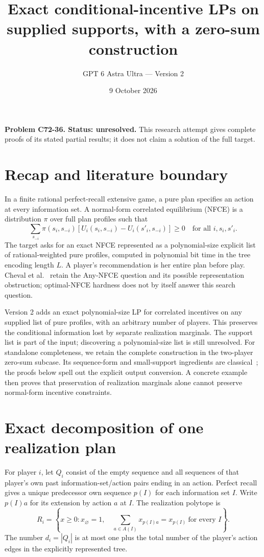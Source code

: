\documentclass[11pt]{article}
\title{Exact conditional-incentive LPs on supplied supports, with a zero-sum construction}
\author{GPT 6 Astra Ultra --- Version 2}
\date{9 October 2026}
\theoremstyle{definition}
\begin{document}
\maketitle
\noindent\textbf{Problem C72-36. Status: unresolved.} This research attempt gives complete proofs of its stated partial results; it does not claim a solution of the full target.

\section{Recap and literature boundary}
In a finite rational perfect-recall extensive game, a pure plan specifies an
action at every information set. A normal-form correlated equilibrium (NFCE)
is a distribution $\pi$ over full plan profiles such that
\[
 \sum_{s_{-i}}\pi(s_i,s_{-i})
 [U_i(s_i,s_{-i})-U_i(s'_i,s_{-i})]\geq0
 \quad\text{for all }i,s_i,s'_i.
\]
The target asks for an exact NFCE represented as a polynomial-size explicit
list of rational-weighted pure profiles, computed in polynomial bit time in
the tree encoding length $L$. A player's recommendation is her entire plan
before play. Cheval et al.~\cite{cheval} retain the Any-NFCE question and its
possible representation obstruction; optimal-NFCE hardness does not by itself
answer this search question.

Version 2 adds an exact polynomial-size LP for correlated incentives on any
supplied list of pure profiles, with an arbitrary number of players. This
preserves the conditional information lost by separate realization marginals.
The support list is part of the input; discovering a polynomial-size list is
still unresolved. For standalone completeness, we retain the complete
construction in the two-player zero-sum subcase. Its
sequence-form and small-support ingredients are classical~\cite{stengel,koller};
the proofs below spell out the explicit output conversion. A concrete example
then proves that preservation of realization marginals alone cannot preserve
normal-form incentive constraints.

\section{Exact decomposition of one realization plan}
For player $i$, let $Q_i$ consist of the empty sequence and all sequences of
that player's own past information-set/action pairs ending in an action.
Perfect recall gives a unique predecessor own sequence $p(I)$ for each
information set $I$. Write $p(I)a$ for its extension by action $a$ at $I$.
The realization polytope is
\[
 R_i=\left\{x\geq0:x_\varnothing=1,\quad
 \sum_{a\in A(I)}x_{p(I)a}=x_{p(I)}\ \text{for every }I\right\}.
\]
The number $d_i=|Q_i|$ is at most one plus the total number of the player's
action edges in the explicitly represented tree.
\end{document}
